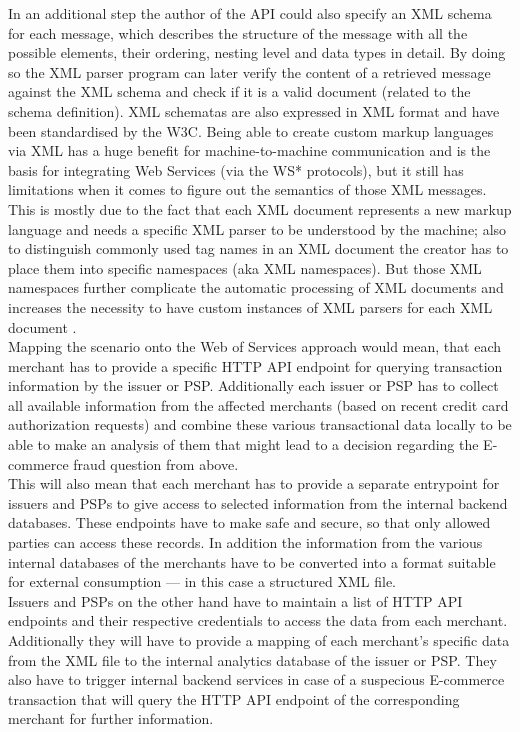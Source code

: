 In an additional step the author of the API could also specify an XML schema for each message, which describes the structure of the message with all the possible elements, their ordering, nesting level and data types in detail. By doing so the XML parser program can later verify the content of a retrieved message against the XML schema and check if it is a valid document (related to the schema definition). XML schematas are also expressed in XML format and have been standardised by the W3C. Being able to create custom markup languages via XML has a huge benefit for machine-to-machine communication and is the basis for integrating Web Services (via the WS* protocols), but it still has limitations when it comes to figure out the semantics of those XML messages. This is mostly due to the fact that each XML document represents a new markup language and needs a specific XML parser to be understood by the machine; also to distinguish commonly used tag names in an XML document the creator has to place them into specific namespaces (aka XML namespaces). But those XML namespaces further complicate the automatic processing of XML documents and increases the necessity to have custom instances of XML parsers for each XML document \citep{taylor2008p2p}. \\

Mapping the scenario onto the Web of Services approach would mean, that each merchant has to provide a specific \gls{HTTP} \gls{API} endpoint for querying transaction information by the issuer or \gls{PSP}. Additionally each issuer or \gls{PSP} has to collect all available information from the affected merchants (based on recent credit card authorization requests) and combine these various transactional data locally to be able to make an analysis of them that might lead to a decision regarding the E-commerce fraud question from above. \\

This will also mean that each merchant has to provide a separate entrypoint for issuers and \gls{PSP}s to give access to selected information from the internal backend databases. These endpoints have to make safe and secure, so that only allowed parties can access these records. In addition the information from the various internal databases of the merchants have to be converted into a format suitable for external consumption --- in this case a structured \gls{XML} file. \\

Issuers and \gls{PSP}s on the other hand have to maintain a list of \gls{HTTP} \gls{API} endpoints and their respective credentials to access the data from each merchant. Additionally they will have to provide a mapping of each merchant's specific data from the \gls{XML} file to the internal analytics database of the issuer or \gls{PSP}. They also have to trigger internal backend services in case of a suspecious E-commerce transaction that will query the \gls{HTTP} \gls{API} endpoint of the corresponding merchant for further information. \\

